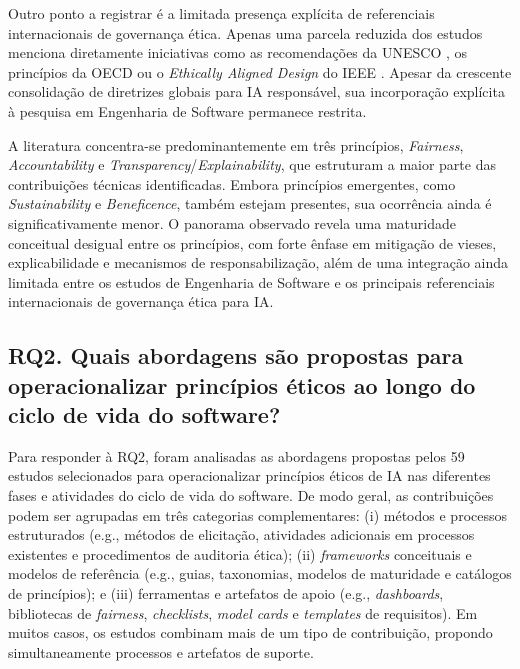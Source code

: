 Outro ponto a registrar é a limitada presença explícita de referenciais internacionais de governança ética. Apenas uma parcela reduzida dos estudos menciona diretamente iniciativas como as recomendações da UNESCO \cite{UNESCO2021}, os princípios da OECD \cite{OECD2019} ou o \textit{Ethically Aligned Design} do IEEE \cite{IEEE2019}. Apesar da crescente consolidação de diretrizes globais para IA responsável, sua incorporação explícita à pesquisa em Engenharia de Software permanece restrita.

\begin{tcolorbox}[colback=blue!5!white, colframe=blue!60!black, title=Resumo da RQ1]
A literatura concentra-se predominantemente em três princípios, \textit{Fairness}, \textit{Accountability} e \textit{Transparency}/\textit{Explainability}, que estruturam a maior parte das contribuições técnicas identificadas. Embora princípios emergentes, como \textit{Sustainability} e \textit{Beneficence}, também estejam presentes, sua ocorrência ainda é significativamente menor. O panorama observado revela uma maturidade conceitual desigual entre os princípios, com forte ênfase em mitigação de vieses, explicabilidade e mecanismos de responsabilização, além de uma integração ainda limitada entre os estudos de Engenharia de Software e os principais referenciais internacionais de governança ética para IA.
\end{tcolorbox}

\subsection{RQ2. Quais abordagens são propostas para operacionalizar princípios éticos ao longo do ciclo de vida do software?}

Para responder à RQ2, foram analisadas as abordagens propostas pelos 59 estudos selecionados para operacionalizar princípios éticos de IA nas diferentes fases e atividades do ciclo de vida do software. De modo geral, as contribuições podem ser agrupadas em três categorias complementares: (i) métodos e processos estruturados (e.g., métodos de elicitação, atividades adicionais em processos existentes e procedimentos de auditoria ética); (ii) \textit{frameworks} conceituais e modelos de referência (e.g., guias, taxonomias, modelos de maturidade e catálogos de princípios); e (iii) ferramentas e artefatos de apoio (e.g., \textit{dashboards}, bibliotecas de \textit{fairness}, \textit{checklists}, \textit{model cards} e \textit{templates} de requisitos). Em muitos casos, os estudos combinam mais de um tipo de contribuição, propondo simultaneamente processos e artefatos de suporte.



